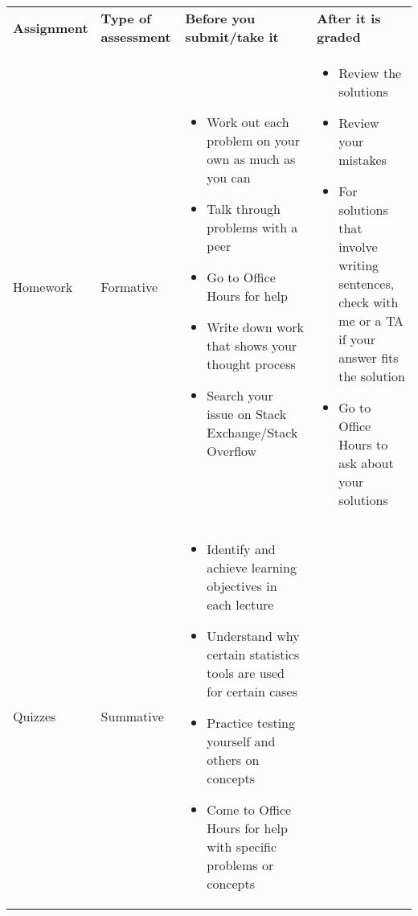 \documentclass[
  letterpaper,
  DIV=11,
  numbers=noendperiod]{scrartcl}
\begin{document}
\begin{longtable}[]{@{}
  >{\centering\arraybackslash}p{}
  >{\centering\arraybackslash}p{}
  >{\raggedright\arraybackslash}p{}
  >{\raggedright\arraybackslash}p{}@{}}
\toprule\noalign{}
\endhead
\bottomrule\noalign{}
\endlastfoot
\textbf{Assignment} & \textbf{Type of assessment} & \textbf{Before you
submit/take it} & \textbf{After it is graded} \\
Homework & Formative & \begin{minipage}[t]{\linewidth}\raggedright
\begin{itemize}
\item
  Work out each problem on your own as much as you can
\item
  Talk through problems with a peer
\item
  Go to Office Hours for help
\item
  Write down work that shows your thought process
\item
  Search your issue on Stack Exchange/Stack Overflow
\end{itemize}
\end{minipage} & \begin{minipage}[t]{\linewidth}\raggedright
\begin{itemize}
\item
  Review the solutions
\item
  Review your mistakes
\item
  For solutions that involve writing sentences, check with me or a TA if
  your answer fits the solution
\item
  Go to Office Hours to ask about your solutions
\end{itemize}
\end{minipage} \\
Quizzes & Summative & \begin{minipage}[t]{\linewidth}\raggedright
\begin{itemize}
\item
  Identify and achieve learning objectives in each lecture
\item
  Understand why certain statistics tools are used for certain cases
\item
  Practice testing yourself and others on concepts
\item
  Come to Office Hours for help with specific problems or concepts
\end{itemize}

\end{minipage}
\end{longtable}
\end{document}
